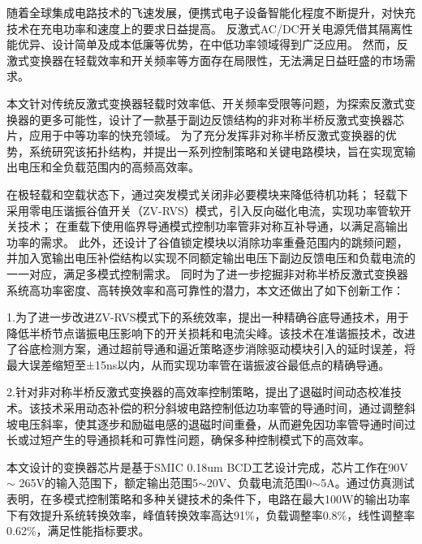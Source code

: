 随着全球集成电路技术的飞速发展，便携式电子设备智能化程度不断提升，对快充技术在充电功率和速度上的要求日益提高。
反激式AC/DC开关电源凭借其隔离性能优异、设计简单及成本低廉等优势，在中低功率领域得到广泛应用。
然而，反激式变换器在轻载效率和开关频率等方面存在局限性，无法满足日益旺盛的市场需求。


本文针对传统反激式变换器轻载时效率低、开关频率受限等问题，为探索反激式变换器的更多可能性，设计了一款基于副边反馈结构的非对称半桥反激式变换器芯片，应用于中等功率的快充领域。
为了充分发挥非对称半桥反激式变换器的优势，系统研究该拓扑结构，并提出一系列控制策略和关键电路模块，旨在实现宽输出电压和全负载范围内的高频高效率。

在极轻载和空载状态下，通过突发模式关闭非必要模块来降低待机功耗；%
轻载下采用零电压谐振谷值开关（ZV-RVS）模式，引入反向磁化电流，实现功率管软开关技术；
在重载下使用临界导通模式控制功率管非对称互补导通，以满足高输出功率的需求。
此外，还设计了谷值锁定模块以消除功率重叠范围内的跳频问题，并加入宽输出电压补偿结构以实现不同额定输出电压下副边反馈电压和负载电流的一一对应，满足多模式控制需求。
同时为了进一步挖掘非对称半桥反激式变换器系统高功率密度、高转换效率和高可靠性的潜力，本文还做出了如下创新工作：

1.为了进一步改进ZV-RVS模式下的系统效率，提出一种精确谷底导通技术，用于降低半桥节点谐振电压影响下的开关损耗和电流尖峰。该技术在准谐振技术，改进了谷底检测方案，通过超前导通和逼近策略逐步消除驱动模块引入的延时误差，将最大误差缩短至±15ns以内，从而实现功率管在谐振波谷最低点的精确导通。

2.针对非对称半桥反激式变换器的高效率控制策略，提出了退磁时间动态校准技术。该技术采用动态补偿的积分斜坡电路控制低边功率管的导通时间，通过调整斜坡电压斜率，使其逐步和励磁电感的退磁时间重叠，从而避免因功率管导通时间过长或过短产生的导通损耗和可靠性问题，确保多种控制模式下的高效率。


本文设计的变换器芯片是基于SMIC 0.18um BCD工艺设计完成，芯片工作在90V $\sim$ 265V的输入范围下，额定输出范围5$\sim$20V、负载电流范围0$\sim$5A。通过仿真测试表明，在多模式控制策略和多种关键技术的条件下，电路在最大100W的输出功率下有效提升系统转换效率，峰值转换效率高达91\%，负载调整率0.8\%，线性调整率0.62\%，满足性能指标要求。